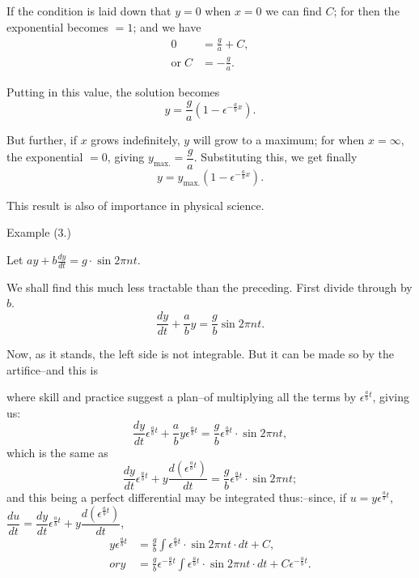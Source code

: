 \documentclass{ximera}
\begin{document}
If the condition is laid down that $y = 0$ when $x = 0$
we can find $C$; for then the exponential becomes $= 1$;
and we have
\begin{align*}
                0 &= \frac{g}{a} + C, \\
 \text{or}\;  C &= -\frac{g}{a}.
\end{align*}

Putting in this value, the solution becomes
\[
y = \frac{g}{a} (1-\epsilon^{-\frac{a}{b} x}).
\]

But further, if $x$ grows indefinitely, $y$ will grow to
a maximum; for when $x=\infty$, the exponential $= 0$,
giving $y_{\text{max.}} = \dfrac{g}{a}$. Substituting this, we get finally
\[
y = y_{\text{max.}}(1-\epsilon^{-\frac{a}{b} x}).
\]

This result is also of importance in physical science.


Example (3.)

   Let $ay+b\frac{dy}{dt} = g · \sin 2\pi nt$.


We shall find this much less tractable than the
preceding. First divide through by $b$.
\[
\frac{dy}{dt} + \frac{a}{b}y = \frac{g}{b} \sin 2\pi nt.
\]

Now, as it stands, the left side is not integrable.
But it can be made so by the artifice–and this is

where skill and practice suggest a plan–of multiplying
all the terms by $\epsilon^{\frac{a}{b} t}$, giving us:
\[
\frac{dy}{dt} \epsilon^{\frac{a}{b} t} + \frac{a}{b} y \epsilon^{\frac{a}{b} t} = \frac{g}{b} \epsilon^{\frac{a}{b} t} · \sin 2 \pi nt,
\]
which is the same as
\[
\frac{dy}{dt} \epsilon^{\frac{a}{b} t} + y \frac{d(\epsilon^{\frac{a}{b} t})}{dt} = \frac{g}{b} \epsilon^{\frac{a}{b} t} · \sin 2 \pi nt;
\]
and this being a perfect differential may be integrated
thus:–since, if  $u = y\epsilon^{\frac{a}{b} t}$, $\dfrac{du}{dt} = \dfrac{dy}{dt} \epsilon^{\frac{a}{b} t} + y \dfrac{d(\epsilon^{\frac{a}{b} t})}{dt}$,
\begin{align*}
  y \epsilon^{\frac{a}{b} t}
  &= \frac{g}{b} \int \epsilon^{\frac{a}{b} t} · \sin 2 \pi nt · dt + C, \\
 or
y &= \frac{g}{b} \epsilon^{-\frac{a}{b} t}
     \int \epsilon^{ \frac{a}{b} t} · \sin 2\pi nt · dt
       + C\epsilon^{-\frac{a}{b} t}.
\tag*{[A]}
\end{align*}
\end{document}
